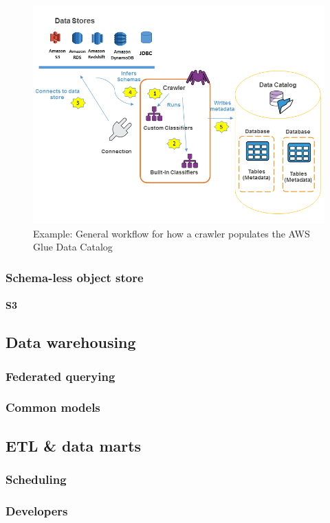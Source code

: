\documentclass[10pt]{article}
\begin{document}
\newpage
\begin{figure}[h!]
	\centering
	\includegraphics[width=0.9\linewidth]{images/PopulateCatalog-overview.png}
	\caption*{Example: General workflow for how a crawler populates the AWS Glue Data Catalog}
\end{figure}
\subsubsection{Schema-less object store}
\paragraph{S3}

\subsection{Data warehousing}
\subsubsection{Federated querying}
\subsubsection{Common models}

\subsection{ETL \& data marts}
\subsubsection{Scheduling}
\subsubsection{Developers}
\end{document}
